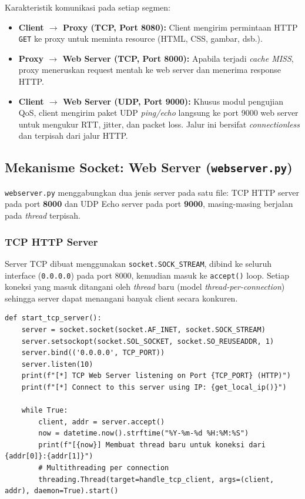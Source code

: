 \documentclass[11pt,a4paper]{article}
\begin{document}
\noindent Karakteristik komunikasi pada setiap segmen:
\begin{itemize}[noitemsep]
    \item \textbf{Client $\rightarrow$ Proxy (TCP, Port 8080):} Client mengirim permintaan HTTP \texttt{GET} ke proxy untuk meminta resource (HTML, CSS, gambar, dsb.).
    \item \textbf{Proxy $\rightarrow$ Web Server (TCP, Port 8000):} Apabila terjadi \textit{cache MISS}, proxy meneruskan request mentah ke web server dan menerima response HTTP.
    \item \textbf{Client $\rightarrow$ Web Server (UDP, Port 9000):} Khusus modul pengujian QoS, client mengirim paket UDP \textit{ping/echo} langsung ke port 9000 web server untuk mengukur RTT, jitter, dan packet loss. Jalur ini bersifat \textit{connectionless} dan terpisah dari jalur HTTP.
\end{itemize}

\subsection{Mekanisme Socket: Web Server (\texttt{webserver.py})}

\texttt{webserver.py} menggabungkan dua jenis server pada satu file: TCP HTTP server pada port \textbf{8000} dan UDP Echo server pada port \textbf{9000}, masing-masing berjalan pada \textit{thread} terpisah.

\subsubsection{TCP HTTP Server}

Server TCP dibuat menggunakan \texttt{socket.SOCK\_STREAM}, dibind ke seluruh interface (\texttt{0.0.0.0}) pada port 8000, kemudian masuk ke \texttt{accept()} loop. Setiap koneksi yang masuk ditangani oleh \textit{thread} baru (model \textit{thread-per-connection}) sehingga server dapat menangani banyak client secara konkuren.

\begin{lstlisting}[caption={Inisialisasi TCP Server dan model thread-per-connection pada \texttt{webserver.py}}, label={lst:tcp-init}]
def start_tcp_server():
    server = socket.socket(socket.AF_INET, socket.SOCK_STREAM)
    server.setsockopt(socket.SOL_SOCKET, socket.SO_REUSEADDR, 1)
    server.bind(('0.0.0.0', TCP_PORT))
    server.listen(10)
    print(f"[*] TCP Web Server listening on Port {TCP_PORT} (HTTP)")
    print(f"[*] Connect to this server using IP: {get_local_ip()}")

    while True:
        client, addr = server.accept()
        now = datetime.now().strftime("%Y-%m-%d %H:%M:%S")
        print(f"[{now}] Membuat thread baru untuk koneksi dari {addr[0]}:{addr[1]}")
        # Multithreading per connection
        threading.Thread(target=handle_tcp_client, args=(client, addr), daemon=True).start()
\end{lstlisting}
\end{document}
